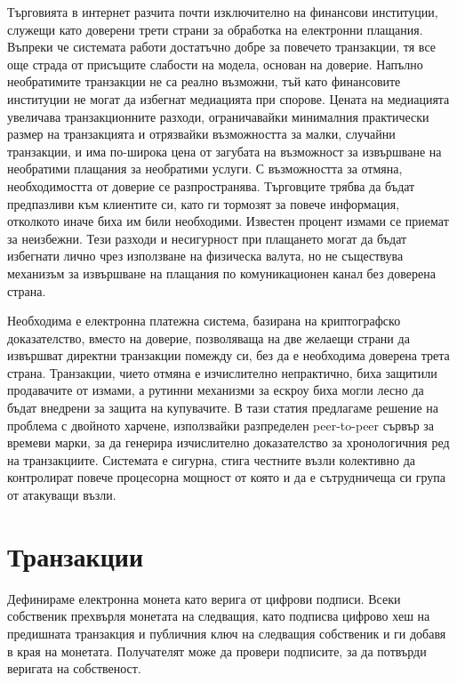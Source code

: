 \documentclass[11pt,a4paper]{article}
\begin{document}
Търговията в интернет разчита почти изключително на финансови институции, служещи като доверени трети страни за обработка на електронни плащания. Въпреки че системата работи достатъчно добре за повечето транзакции, тя все още страда от присъщите слабости на модела, основан на доверие. Напълно необратимите транзакции не са реално възможни, тъй като финансовите институции не могат да избегнат медиацията при спорове. Цената на медиацията увеличава транзакционните разходи, ограничавайки минималния практически размер на транзакцията и отрязвайки възможността за малки, случайни транзакции, и има по-широка цена от загубата на възможност за извършване на необратими плащания за необратими услуги. С възможността за отмяна, необходимостта от доверие се разпространява. Търговците трябва да бъдат предпазливи към клиентите си, като ги тормозят за повече информация, отколкото иначе биха им били необходими. Известен процент измами се приемат за неизбежни. Тези разходи и несигурност при плащането могат да бъдат избегнати лично чрез използване на физическа валута, но не съществува механизъм за извършване на плащания по комуникационен канал без доверена страна.

Необходима е електронна платежна система, базирана на криптографско доказателство, вместо на доверие, позволяваща на две желаещи страни да извършват директни транзакции помежду си, без да е необходима доверена трета страна. Транзакции, чието отмяна е изчислително непрактично, биха защитили продавачите от измами, а рутинни механизми за ескроу биха могли лесно да бъдат внедрени за защита на купувачите. В тази статия предлагаме решение на проблема с двойното харчене, използвайки разпределен peer-to-peer сървър за времеви марки, за да генерира изчислително доказателство за хронологичния ред на транзакциите. Системата е сигурна, стига честните възли колективно да контролират повече процесорна мощност от която и да е сътрудничеща си група от атакуващи възли.

\section{Транзакции}

Дефинираме електронна монета като верига от цифрови подписи. Всеки собственик прехвърля монетата на следващия, като подписва цифрово хеш на предишната транзакция и публичния ключ на следващия собственик и ги добавя в края на монетата. Получателят може да провери подписите, за да потвърди веригата на собственост.

\end{document}
